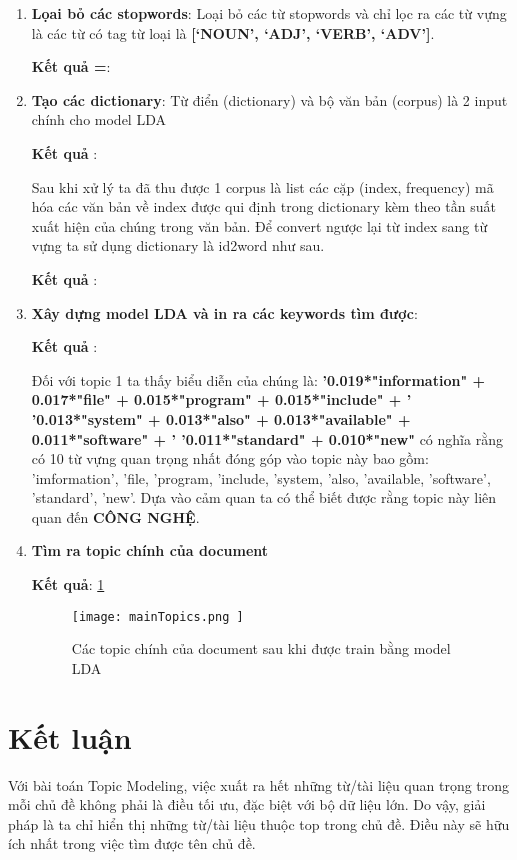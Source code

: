 \begin{enumerate}
	\item \textbf{Lọai bỏ các stopwords}: Loại bỏ các từ stopwords và chỉ lọc ra các từ vựng là các từ có tag từ loại là \textbf{[‘NOUN’, ‘ADJ’, ‘VERB’, ‘ADV’]}.
	
	\textbf{Kết quả =}:
	
	
	\item \textbf{Tạo các dictionary}: Từ điển (dictionary) và bộ văn bản (corpus) là 2 input chính cho model LDA
	
	
	\textbf{Kết quả }:
	
	
	Sau khi xử lý ta đã thu được 1 corpus là list các cặp (index, frequency) mã hóa các văn bản về index được qui định trong dictionary kèm theo tần suất xuất hiện của chúng trong văn bản. Để convert ngược lại từ index sang từ vựng ta sử dụng dictionary là id2word như sau.
	
	\textbf{Kết quả }:
	
	
	\item \textbf{Xây dựng model LDA và in ra các keywords tìm được}:
	
	\textbf{Kết quả }:
	
	Đối với topic 1 ta thấy biểu diễn của chúng là: \textbf{'0.019*"information" + 0.017*"file" + 0.015*"program" + 0.015*"include" + '
		'0.013*"system" + 0.013*"also" + 0.013*"available" + 0.011*"software" + '
		'0.011*"standard" + 0.010*"new"} có nghĩa rằng có 10 từ vựng quan trọng nhất đóng góp vào topic này bao gồm: 'imformation', 'file, 'program, 'include, 'system, 'also, 'available, 'software', 'standard', 'new'. Dựa vào cảm quan ta có thể biết được rằng topic này liên quan đến \textbf{CÔNG NGHỆ}.
	
	\item \textbf{Tìm ra topic chính của document}
	
	\textbf{Kết quả}: \ref{mainTopics}
	\begin{figure}[h!]
		\centering
		\texttt{[image: 
			mainTopics.png
		]}
		\caption[Các topic chính của document sau khi được train bằng model LDA]{
			Các topic chính của document sau khi được train bằng model LDA  \label{mainTopics} \cite{WEBSITE:14}
		}
	\end{figure}
\end{enumerate}

\section{Kết luận}
Với bài toán Topic Modeling, việc xuất ra hết những từ/tài liệu quan trọng trong mỗi chủ đề không phải là điều tối ưu, đặc biệt với bộ dữ liệu lớn. Do vậy, giải pháp là ta chỉ hiển thị những từ/tài liệu thuộc top trong chủ đề. Điều này sẽ hữu ích nhất trong việc tìm được tên chủ đề. \cite{WEBSITE:15}
